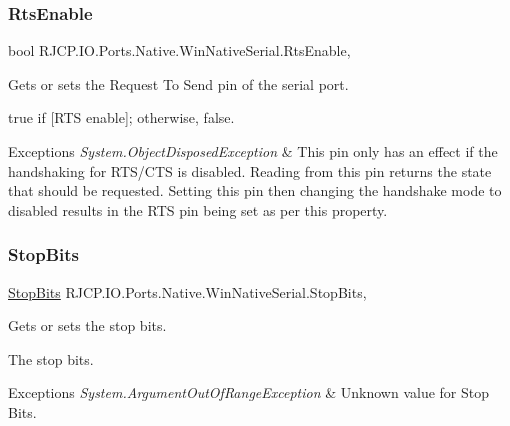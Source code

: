 \subsubsection{\texorpdfstring{RtsEnable}{RtsEnable}}
{\footnotesize\ttfamily bool R\+J\+C\+P.\+I\+O.\+Ports.\+Native.\+Win\+Native\+Serial.\+Rts\+Enable\hspace{0.3cm}{\ttfamily [get]}, {\ttfamily [set]}}



Gets or sets the Request To Send pin of the serial port. 

{\ttfamily true} if \mbox{[}R\+TS enable\mbox{]}; otherwise, {\ttfamily false}. 


\begin{DoxyExceptions}{Exceptions}
{\em System.\+Object\+Disposed\+Exception} & This pin only has an effect if the handshaking for R\+T\+S/\+C\+TS is disabled. Reading from this pin returns the state that should be requested. Setting this pin then changing the handshake mode to disabled results in the R\+TS pin being set as per this property. \\
\hline
\end{DoxyExceptions}
\mbox{\label{class_r_j_c_p_1_1_i_o_1_1_ports_1_1_native_1_1_win_native_serial_a40d3b2270c75dfafc0aa9be692f721be}} 
\subsubsection{\texorpdfstring{StopBits}{StopBits}}
{\footnotesize\ttfamily \mbox{\hyperlink{namespace_r_j_c_p_1_1_i_o_1_1_ports_a56a13b591d46736acafe20f2976c84fa}{Stop\+Bits}} R\+J\+C\+P.\+I\+O.\+Ports.\+Native.\+Win\+Native\+Serial.\+Stop\+Bits\hspace{0.3cm}{\ttfamily [get]}, {\ttfamily [set]}}



Gets or sets the stop bits. 

The stop bits. 


\begin{DoxyExceptions}{Exceptions}
{\em System.\+Argument\+Out\+Of\+Range\+Exception} & Unknown value for Stop Bits.\\
\hline
\end{DoxyExceptions}
\mbox{\label{class_r_j_c_p_1_1_i_o_1_1_ports_1_1_native_1_1_win_native_serial_a415c1567a4d70a4cd03408a82819f224}} 
